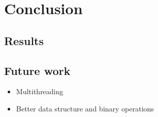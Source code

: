 \documentclass[a4paper]{article}
\begin{document}
%
%
\newpage

\section{Conclusion}
\subsection{Results}
\subsection{Future work}
\begin{itemize}
    \item Multithreading
    \item Better data structure and binary operations
\end{itemize}





%
%
\newpage

\end{document}
